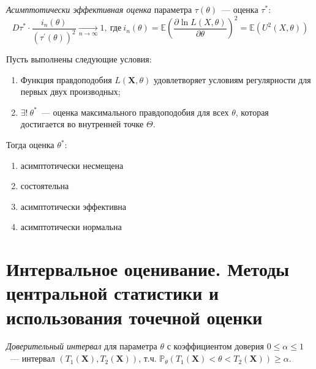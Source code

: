 \begin{defn}
    {\it Асимптотически эффективная оценка} параметра $\tau(\theta)$~--- оценка $\tau^{*}$:
    \begin{equation*}
        D \tau^{*} \cdot \frac{i_{n}(\theta)}{\left(\tau^{\prime}(\theta)\right)^{2}} \xrightarrow[n \to \infty]{} 1,~ \text{где}~ i_{n}(\theta)=\mathbb{E}\left(\frac{\partial \ln L(X, \theta)}{\partial \theta}\right)^{2} = \mathbb{E}(U^{2}(X, \theta))
    \end{equation*}
\end{defn}

\begin{thm*}
    Пусть выполнены следующие условия:
    \begin{enumerate}
        \item Функция правдоподобия $L(\mathbf{X}, \theta)$ удовлетворяет условиям регулярности для первых двух производных;
        \item $\exists!~ \theta^{*}$~--- оценка максимального правдоподобия для всех $\theta$, которая достигается во внутренней точке $\Theta$.
    \end{enumerate}
    Тогда оценка $\theta^{*}$:
    \begin{enumerate}
        \item асимптотически несмещена
        \item состоятельна
        \item асимптотически эффективна
        \item асимптотически нормальна
    \end{enumerate}
\end{thm*}

\section{Интервальное оценивание. Методы центральной статистики и использования точечной оценки}

\begin{defn}
{\it Доверительный интервал} для параметра $\theta$ с коэффициентом доверия $0 \leqslant \alpha \leqslant 1$~--- интервал $(T_1(\mathbf{X}), T_2(\mathbf{X}))$, т.ч. $\mathbb{P}_{\theta}(T_1(\mathbf{X}) < \theta < T_2(\mathbf{X})) \geqslant \alpha$.
\end{defn}

